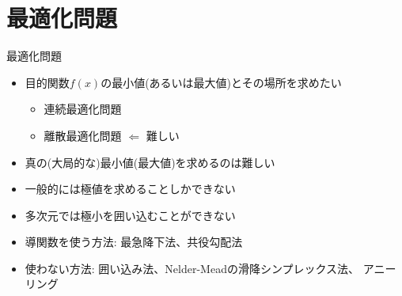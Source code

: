 \section{最適化問題}

\begin{frame}[t,fragile]{最適化問題}
  \begin{itemize}
    \setlength{\itemsep}{1em}
  \item 目的関数$f(x)$の最小値(あるいは最大値)とその場所を求めたい
    \begin{itemize}
    \item 連続最適化問題
    \item 離散最適化問題 $\Leftarrow$ 難しい
    \end{itemize}
  \item 真の(大局的な)最小値(最大値)を求めるのは難しい
  \item 一般的には極値を求めることしかできない
  \item 多次元では極小を囲い込むことができない
  \item 導関数を使う方法: 最急降下法、共役勾配法
  \item 使わない方法: 囲い込み法、Nelder-Meadの滑降シンプレックス法、
    アニーリング
  \end{itemize}
\end{frame}
